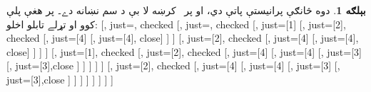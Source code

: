 \documentclass[12pt,a4paper,oneside]{report}
\newenvironment{oltableau}
  {\center\LTR\tableau{}}
  {\endtableau\endLTR\endcenter}
\theoremstyle{definition}
\newtheorem{ex}[thm]{بېلګه}
\begin{document}
\begin{ex}
\label{olpseg:OLP-0103-B013:start}
دوه څانګې پرانيستې پاتې دي، او پر~ کرښه
 لا بې د سم نښانه دے۔ پر هغې
\LR{$\TRule{\True}{\land}$} پلې کوو او تړلے تابلو اخلو:
\begin{oltableau}
  [,
    just=\TAss, checked
    [, just=\TAss, checked
      [, just={\TRule{\True}{\lor}[1]}
        [,
          just={\TRule{\False}{\land}[2]}, checked
          [,
            just={\TRule{\False}{\lor}[4]}
            [,
              just={\TRule{\False}{\lor}[4]}, close]
          ]
        ]
        [,
          just={\TRule{\False}{\land}[2]}, checked
          [,
            just={\TRule{\False}{\lor}[4]}
            [,
              just={\TRule{\False}{\lor}[4]}, close]
          ]
        ]
      ]
      [,
        just={\TRule{\True}{\lor}[1]}, checked
        [,
          just={\TRule{\False}{\land}[2]}, checked
          [,
            just={\TRule{\False}{\lor}[4]}
            [,
              just={\TRule{\False}{\lor}[4]}
              [,
                just={\TRule{\True}{\land}[3]}
                [,
                  just={\TRule{\True}{\land}[3]},close
                ]
              ]
            ]
          ]
        ]
        [,
          just={\TRule{\False}{\land}[2]}, checked
          [,
            just={\TRule{\False}{\lor}[4]}
            [,
              just={\TRule{\False}{\lor}[4]}
              [,
                just={\TRule{\True}{\land}[3]}
                [,
                  just={\TRule{\True}{\land}[3]},close
                ]
              ]
            ]
          ]
        ]
      ]
    ]
  ]
\end{oltableau}
\label{olpseg:OLP-0103-B013:end}


\end{ex}
\end{document}
